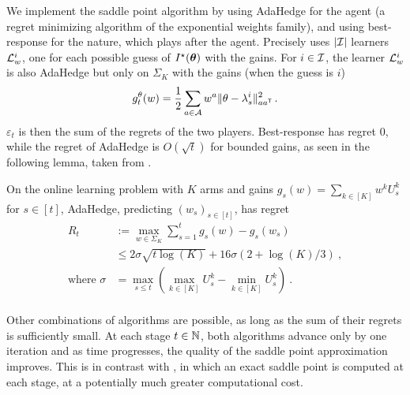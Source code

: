 We implement the saddle point algorithm by using AdaHedge for the agent (a regret minimizing algorithm of the exponential weights family), and using best-response for the nature, which plays after the agent. Precisely \LG uses $|\mathcal{I}|$ learners $\mathcal{L}_w^i$, one for each possible guess of $I^\star({\boldsymbol \theta})$ with the gains. For $i\in\mathcal{I}$, the learner $\mathcal{L}_w^i$ is also AdaHedge but only on $\Sigma_K$ with the gains (when the guess is $i$)
\[
    g_t^\theta(w) = \frac{1}{2} \sum_{a\in\mathcal{A}}  w^{a} \Vert \theta - \lambda_s^i \Vert^2_{a a^{\mathsf{\scriptscriptstyle T}}}\,.
\]
$\varepsilon_t$ is then the sum of the regrets of the two players. Best-response has regret 0, while the regret of AdaHedge is $O(\sqrt{t})$ for bounded gains, as seen in the following lemma, taken from \citet{derooij2014hedge}.
\begin{lemma}\label{lem:adahedge}
On the online learning problem with $K$ arms and gains $g_s(w) = \sum_{k\in[K]} w^k  U_s^k$ for $s\in[t]$, AdaHedge, predicting $(w_s)_{s\in[t]}$, has regret
\begin{align*}
R_t&:= \max_{w\in\Sigma_K}\sum_{s=1}^t g_s(w) -g_s(w_s) \\
&\le 2\sigma\sqrt{t\log(K)} + 16\sigma(2+\log(K)/3) \: ,\\
\text{where }
\sigma &= \max_{s\le t}  (\max_{k\in[K]}U_s^{k}- \min_{k\in[K]}U_s^{k}) \:.\\
\end{align*}
\end{lemma}
Other combinations of algorithms are possible, as long as the sum of their regrets is sufficiently small. At each stage $t\in{\mathbb N}$, both algorithms advance only by one iteration and as time progresses, the quality of the saddle point approximation improves. This is in contrast with \Track \cite{garivier2016tracknstop}, in which an exact saddle point is computed at each stage, at a potentially much greater computational cost.

